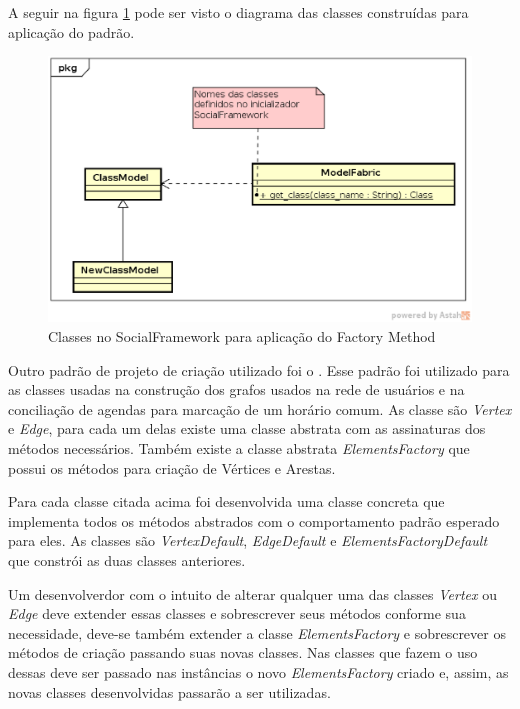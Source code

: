 A seguir na figura \ref{padrao_factory_method} pode ser visto o diagrama das classes construídas para aplicação do padrão.

\newpage
\begin{figure}[h]
    \centering
    \includegraphics[scale=0.6]{figuras/capitulo6/factory_method.eps}
    \caption{Classes no SocialFramework para aplicação do Factory Method}
    \label{padrao_factory_method}
\end{figure}

Outro padrão de projeto de criação utilizado foi o . Esse padrão foi utilizado para as classes usadas na construção dos grafos usados na rede de usuários e na conciliação de agendas para marcação de um horário comum. As classe são \textit{Vertex} e \textit{Edge}, para cada um delas existe uma classe abstrata com as assinaturas dos métodos necessários. Também existe a classe abstrata \textit{ElementsFactory} que possui os métodos para criação de Vértices e Arestas.

Para cada classe citada acima foi desenvolvida uma classe concreta que implementa todos os métodos abstrados com o comportamento padrão esperado para eles. As classes são \textit{VertexDefault}, \textit{EdgeDefault} e \textit{ElementsFactoryDefault} que constrói as duas classes anteriores.

Um desenvolverdor com o intuito de alterar qualquer uma das classes \textit{Vertex} ou \textit{Edge} deve extender essas classes e sobrescrever seus métodos conforme sua necessidade, deve-se também extender a classe \textit{ElementsFactory} e sobrescrever os métodos de criação passando suas novas classes. Nas classes que fazem o uso dessas deve ser passado nas instâncias o novo \textit{ElementsFactory} criado e, assim, as novas classes desenvolvidas passarão a ser utilizadas.

